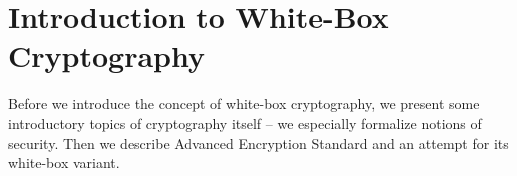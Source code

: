 \chapter{Introduction to White-Box Cryptography}
\label{chap:intro}

Before we introduce the concept of white-box cryptography, we present some introductory topics of cryptography itself -- we especially formalize notions of security. Then we describe Advanced Encryption Standard and an attempt for its white-box variant.









